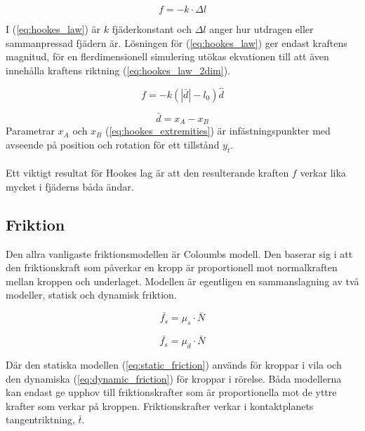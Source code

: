 \documentclass[a4paper,12pt,twopage,swedish]{article}
\begin{document}
\begin{equation}\label{eq:hookes_law}
f = - k \cdot \Delta l
\end{equation}

I (\ref{eq:hookes_law}) är $k$  fjäderkonstant och $\Delta l$ anger hur utdragen eller sammanpressad fjädern är. Lösningen för (\ref{eq:hookes_law}) ger endast  kraftens magnitud, för en flerdimensionell simulering utökas ekvationen till att även innehålla kraftens riktning (\ref{eq:hookes_law_2dim}).

\begin{equation}\label{eq:hookes_law_2dim}
f = - k (|\bar{d}| - l_0)\hat{d}
\end{equation}

\begin{equation}\label{eq:hookes_extremities}
\bar{d} = x_A - x_B
\end{equation}
Parametrar $x_A$ och $x_B$ (\ref{eq:hookes_extremities}) är infästningspunkter med avseende på position och rotation för ett tillstånd $y_t$.
\\
\\Ett viktigt resultat för Hookes lag är att den resulterande kraften $f$ verkar lika mycket i fjäderns båda ändar.

\subsection{Friktion}

Den allra vanligaste friktionsmodellen är Coloumbs modell. Den baserar sig i att den friktionskraft som påverkar en kropp är proportionell mot normalkraften mellan kroppen och underlaget. Modellen är egentligen en sammanslagning av två modeller, statisk och dynamisk friktion.

\begin{equation}\label{eq:static_friction}
\bar{f_s} = \mu_s \cdot \bar{N}
\end{equation}

\begin{equation}\label{eq:dynamic_friction}
\bar{f_s} = \mu_d \cdot \bar{N}
\end{equation}

Där den statiska modellen (\ref{eq:static_friction}) används för kroppar i vila och den dynamiska (\ref{eq:dynamic_friction}) för kroppar i rörelse. Båda modellerna kan endast ge upphov till friktionskrafter som är proportionella mot de yttre krafter som verkar på kroppen. Friktionskrafter verkar i kontaktplanets tangentriktning, $\bar{t}$.
\end{document}

